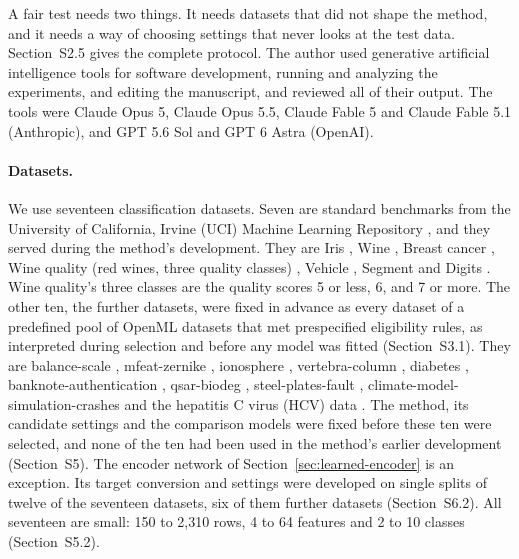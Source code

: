 A fair test needs two things. It needs datasets that did not shape the method, and it needs a way of choosing settings that never looks at the test data. Section~S2.5 gives the complete protocol. The author used generative artificial intelligence tools for software development, running and analyzing the experiments, and editing the manuscript, and reviewed all of their output. The tools were Claude Opus 5, Claude Opus 5.5, Claude Fable 5 and Claude Fable 5.1 (Anthropic), and GPT 5.6 Sol and GPT 6 Astra (OpenAI).

\paragraph{Datasets.} We use seventeen classification datasets. Seven are standard benchmarks from the University of California, Irvine (UCI) Machine Learning Repository \citep{dua2019uci}, and they served during the method's development. They are Iris \citep{uci_iris}, Wine \citep{uci_wine}, Breast cancer \citep{uci_wdbc}, Wine quality (red wines, three quality classes) \citep{uci_winequality}, Vehicle \citep{uci_vehicle}, Segment \citep{uci_segment} and Digits \citep{uci_digits}. Wine quality's three classes are the quality scores 5 or less, 6, and 7 or more. The other ten, the further datasets, were fixed in advance as every dataset of a predefined pool of OpenML datasets \citep{vanschoren2014openml} that met prespecified eligibility rules, as interpreted during selection and before any model was fitted (Section~S3.1). They are balance-scale \citep{uci_balance}, mfeat-zernike \citep{uci_mfeat}, ionosphere \citep{uci_ionosphere}, vertebra-column \citep{uci_vertebral}, diabetes \citep{smith1988diabetes}, banknote-authentication \citep{uci_banknote}, qsar-biodeg \citep{uci_qsar}, steel-plates-fault \citep{uci_steel}, climate-model-simulation-crashes \citep{uci_climate} and the hepatitis C virus (HCV) data \citep{uci_hcv}. The method, its candidate settings and the comparison models were fixed before these ten were selected, and none of the ten had been used in the method's earlier development (Section~S5). The encoder network of Section~\ref{sec:learned-encoder} is an exception. Its target conversion and settings were developed on single splits of twelve of the seventeen datasets, six of them further datasets (Section~S6.2). All seventeen are small: 150 to 2,310 rows, 4 to 64 features and 2 to 10 classes (Section~S5.2).

